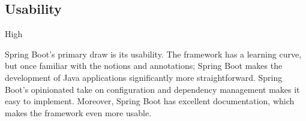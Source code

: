 \subsection*{Usability}

\ranking High

Spring Boot's primary draw is its usability. The framework has a learning curve, but once familiar with the notions and annotations; Spring Boot makes the development of Java applications significantly more straightforward. Spring Boot's opinionated take on configuration and dependency management makes it easy to implement. Moreover, Spring Boot has excellent documentation, which makes the framework even more usable.